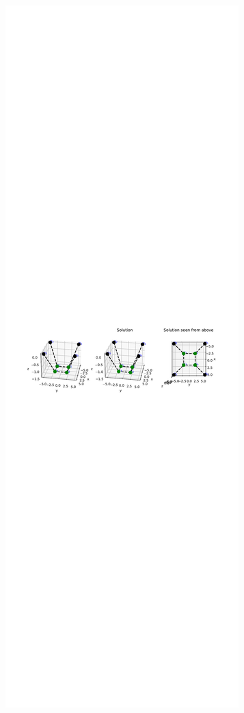 \begin{figure}[!ht]
\centering
\begin{subfigure}{.72\textwidth}
  \centering
  \includegraphics[width=0.99\linewidth]{Bilder/p25.pdf}

\end{subfigure}
\end{figure}
